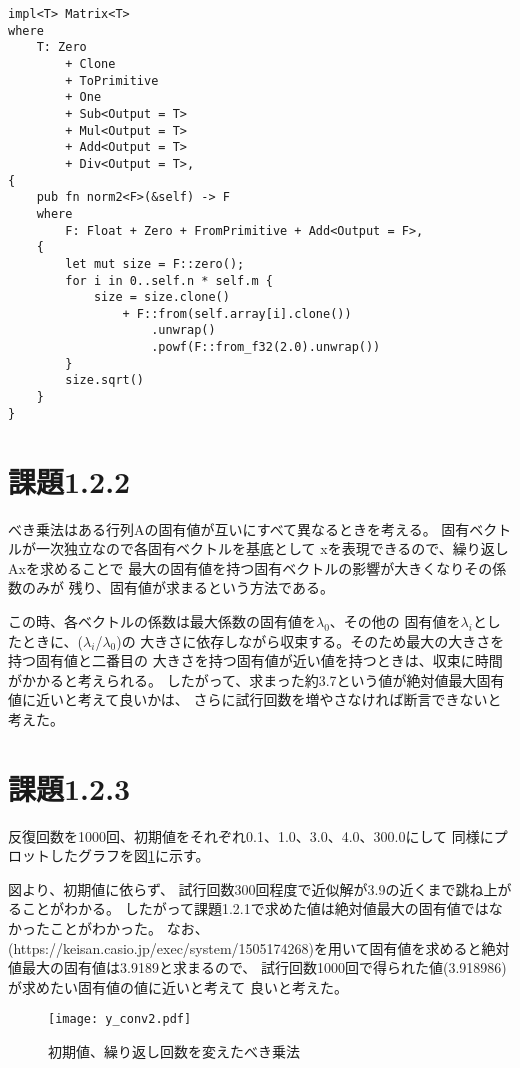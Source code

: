 \documentclass[uplatex, 11pt,a4j, titlepage]{jsarticle}
\begin{document}
\begin{lstlisting}[caption={matrix\_dash.rs}]
impl<T> Matrix<T>
where
    T: Zero
        + Clone
        + ToPrimitive
        + One
        + Sub<Output = T>
        + Mul<Output = T>
        + Add<Output = T>
        + Div<Output = T>,
{
    pub fn norm2<F>(&self) -> F
    where
        F: Float + Zero + FromPrimitive + Add<Output = F>,
    {
        let mut size = F::zero();
        for i in 0..self.n * self.m {
            size = size.clone()
                + F::from(self.array[i].clone())
                    .unwrap()
                    .powf(F::from_f32(2.0).unwrap())
        }
        size.sqrt()
    }
}

\end{lstlisting}

\newpage

\section{課題1.2.2}

べき乗法はある行列Aの固有値が互いにすべて異なるときを考える。
固有ベクトルが一次独立なので各固有ベクトルを基底として
xを表現できるので、繰り返しAxを求めることで
最大の固有値を持つ固有ベクトルの影響が大きくなりその係数のみが
残り、固有値が求まるという方法である。

この時、各ベクトルの係数は最大係数の固有値を$\lambda_{0}$、その他の
固有値を$\lambda_{i}$としたときに、($\lambda_i$/$\lambda_0$)の
大きさに依存しながら収束する。そのため最大の大きさを持つ固有値と二番目の
大きさを持つ固有値が近い値を持つときは、収束に時間がかかると考えられる。
したがって、求まった約3.7という値が絶対値最大固有値に近いと考えて良いかは、
さらに試行回数を増やさなければ断言できないと考えた。


\section{課題1.2.3}
反復回数を1000回、初期値をそれぞれ0.1、1.0、3.0、4.0、300.0にして
同様にプロットしたグラフを図\ref{y_conv2}に示す。

図より、初期値に依らず、
試行回数300回程度で近似解が3.9の近くまで跳ね上がることがわかる。
したがって課題1.2.1で求めた値は絶対値最大の固有値ではなかったことがわかった。
なお、(https://keisan.casio.jp/exec/system/1505174268)を用いて固有値を求めると絶対値最大の固有値は3.9189と求まるので、
試行回数1000回で得られた値(3.918986)が求めたい固有値の値に近いと考えて
良いと考えた。

\begin{figure}[h]
    \centering
    \texttt{[image: y\_conv2.pdf]}
    \caption{初期値、繰り返し回数を変えたべき乗法}
    \label{y_conv2}
\end{figure}
\end{document}
